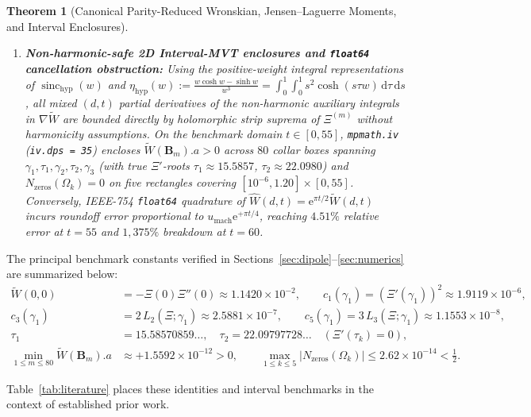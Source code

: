 \documentclass[11pt,a4paper,reqno]{amsart}
\newtheorem{theorem}{Theorem}[section]
\theoremstyle{definition}
\theoremstyle{remark}
\numberwithin{equation}{section}
\newcommand{\dd}{\mathrm{d}}
\newcommand{\ee}{\mathrm{e}}
\newcommand{\Wtil}{\widetilde{W}}
\newcommand{\What}{\widehat{W}}
\newcommand{\sinch}{\operatorname{sinc}_{\mathrm{hyp}}}
\newcommand{\etah}{\eta_{\mathrm{hyp}}}
\begin{document}
\begin{theorem}[Canonical Parity-Reduced Wronskian, Jensen--Laguerre Moments, and Interval Enclosures]
\begin{enumerate}
\item[\textup{(iii)}] \textbf{Non-harmonic-safe 2D Interval-MVT enclosures and \texttt{float64} cancellation obstruction:} Using the positive-weight integral representations of $\sinch(w)$ and $\etah(w) := \frac{w\cosh w - \sinh w}{w^3} = \int_0^1\int_0^1 s^2\cosh(s\tau w)\,\dd\tau\,\dd s$, all mixed $(d,t)$ partial derivatives of the non-harmonic auxiliary integrals in $\nabla\Wtil$ are bounded directly by holomorphic strip suprema of $\Xi^{(m)}$ without harmonicity assumptions. On the benchmark domain $t \in [0, 55]$, \texttt{mpmath.iv} (\texttt{iv.dps = 35}) encloses $\Wtil(\mathbf{B}_m).a > 0$ across $80$ collar boxes spanning $\gamma_1, \tau_1, \gamma_2, \tau_2, \gamma_3$ (with true $\Xi'$-roots $\tau_1 \approx 15.5857$, $\tau_2 \approx 22.0980$) and $N_{\mathrm{zeros}}(\Omega_k) = 0$ on five rectangles covering $[10^{-6}, 1.20] \times [0, 55]$. Conversely, IEEE-754 \texttt{float64} quadrature of $\What(d,t) = \ee^{\pi t/2}\Wtil(d,t)$ incurs roundoff error proportional to $u_{\mathrm{mach}}\ee^{+\pi t/4}$, reaching $4.51\%$ relative error at $t = 55$ and $1{,}375\%$ breakdown at $t = 60$.
\end{enumerate}
\end{theorem}

The principal benchmark constants verified in Sections~\ref{sec:dipole}--\ref{sec:numerics} are summarized below:
\begin{equation}\label{eq:canonical_constants}
\begin{aligned}
\Wtil(0,0) &= -\Xi(0)\Xi''(0) \approx 1.1420 \times 10^{-2}, \qquad
c_1(\gamma_1) = (\Xi'(\gamma_1))^2 \approx 1.9119 \times 10^{-6}, \\
c_3(\gamma_1) &= 2\,L_2(\Xi;\gamma_1) \approx 2.5881 \times 10^{-7}, \qquad
c_5(\gamma_1) = 3\,L_3(\Xi;\gamma_1) \approx 1.1553 \times 10^{-8}, \\
\tau_1 &= 15.58570859\dots, \quad \tau_2 = 22.09797728\dots \quad (\Xi'(\tau_k) = 0), \\
\min_{1\le m\le 80} \Wtil(\mathbf{B}_m).a &\approx +1.5592 \times 10^{-12} > 0, \qquad
\max_{1\le k\le 5} |N_{\mathrm{zeros}}(\Omega_k)| \le 2.62 \times 10^{-14} < \tfrac{1}{2}.
\end{aligned}
\end{equation}

Table~\ref{tab:literature} places these identities and interval benchmarks in the context of established prior work.
\end{document}
